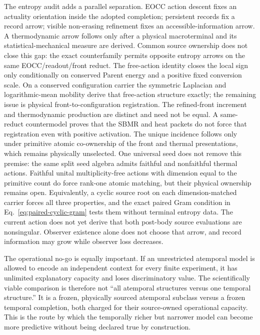 \documentclass[11pt]{article}
\begin{document}
The entropy audit adds a parallel separation.  EOCC action descent fixes an
actuality orientation inside the adopted completion; persistent records fix a
record arrow; visible non-erasing refinement fixes an accessible-information
arrow.  A thermodynamic arrow follows only after a physical macroterminal and
its statistical-mechanical measure are derived.  Common source ownership does
not close this gap: the exact counterfamily permits opposite entropy arrows on
the same EOCC/readout/front reduct.  The free-action identity closes the local
sign only conditionally on conserved Parent energy and a positive fixed
conversion scale.  On a conserved configuration carrier the symmetric
Laplacian and logarithmic-mean mobility derive that free-action structure
exactly; the remaining issue is physical front-to-configuration registration.
The refined-front increment and thermodynamic production are distinct and
need not be equal.  A same-reduct countermodel proves that the SBMR and heat
packets do not force that registration even with positive activation.  The
unique incidence follows only under primitive atomic co-ownership of the
front and thermal presentations, which remains physically unselected.
One universal seed does not remove this premise: the same split seed algebra
admits faithful and nonfaithful thermal actions.  Faithful unital
multiplicity-free actions with dimension equal to the primitive count do
force rank-one atomic matching, but their physical ownership remains open.
Equivalently, a cyclic source root on each dimension-matched carrier forces
all three properties, and the exact paired Gram condition in
Eq.~\eqref{eq:paired-cyclic-gram} tests them without terminal entropy data.
The current action does not yet derive that both post-body source evaluations
are nonsingular.
Observer existence alone
does not choose that arrow, and record information may grow while observer
loss decreases.

The operational no-go is equally important.  If an unrestricted atemporal
model is allowed to encode an independent context for every finite experiment,
it has unlimited explanatory capacity and loses discriminatory value.  The
scientifically viable comparison is therefore not ``all atemporal structures
versus one temporal structure.''  It is a frozen, physically sourced
atemporal subclass versus a frozen temporal completion, both charged for
their source-owned operational capacity.  This is the route by which the
temporally richer but narrower model can become more predictive without being
declared true by construction.
\end{document}
